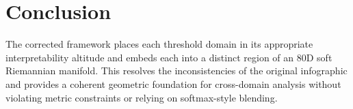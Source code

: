 \documentclass[11pt]{article}
\begin{document}
\section{Conclusion}
The corrected framework places each threshold domain in its appropriate
interpretability altitude and embeds each into a distinct region of an 80D soft
Riemannian manifold. This resolves the inconsistencies of the original
infographic and provides a coherent geometric foundation for cross-domain
analysis without violating metric constraints or relying on softmax-style
blending.
\end{document}
